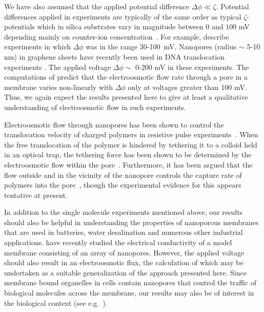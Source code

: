 We have also assumed that the applied potential difference $\Delta\phi\ll\zeta$. Potential differences applied in experiments are typically of the same order as typical $\zeta$-potentials
which in silica substrates vary in magnitude between $0$ and $100$ mV 
depending mainly on counter-ion concentration~\cite{kirby2004zeta,kirby2004zeta2}. 
For example, \cite{Keyser2006} describe experiments in which $\Delta\phi$ was in the range 30-100~mV. Nanopores (radius $\sim$ 5-10 nm) in graphene sheets have recently been used in
DNA translocation experiments \cite{Garaj2010,Schneider2010,Merchant2010}.
The applied voltage $\Delta \phi \sim$ 0-200 mV in these experiments. The computations of \cite{Mao2013} predict that the electroosmotic flow rate through a pore in a membrane
varies non-linearly with $\Delta\phi$ only at voltages greater than 100 mV. Thus, we again expect the results presented here to give at least a qualitative understanding of electroosmotic flow in such experiments.

Electroosmotic flow through nanopores has been shown to control the translocation 
velocity of charged polymers in resistive pulse  
experiments~\cite{ghosal2006electrophoresis,ghosal2007effect}. When the free translocation of the polymer is hindered by tethering it to a colloid held in an optical trap, the tethering force has been shown to be determined by the electroosmotic flow within the pore~\cite{Ghosal2007,Keyser2006,laohakunakorn2013dna}.
Furthermore, it has been argued that the flow outside and in the vicinity of the nanopore 
controls the capture rate of polymers into the pore~\cite{wong2007polymer}, though the 
experimental evidence for this appears tentative at present.

In addition to the single molecule experiments mentioned above, our results should also be helpful 
in understanding the properties of nanoporous membranes that are used in batteries, water desalination and numerous other industrial applications. \cite{gadaleta2014sub} have recently studied the electrical conductivity of a model membrane consisting of an array of nanopores. However, the applied voltage should also result in an electroosmotic flux, the calculation of which may be undertaken as a suitable generalization of the approach presented here. 
Since membrane bound organelles in cells contain nanopores that control the traffic of biological molecules across the membrane, our results may also be of interest in the biological 
context (see e.g.~\cite{gu2003electroosmotic}).